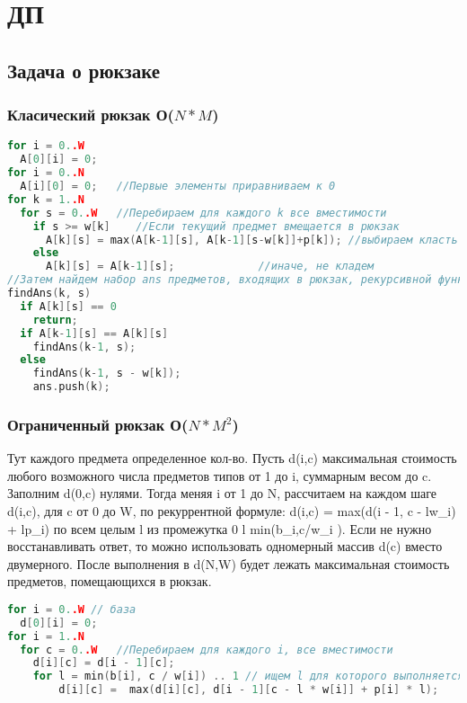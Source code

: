 \chapter{ДП}
\section{Задача о рюкзаке}
\subsection{Класический рюкзак О($N*M$)}
\begin{lstlisting}[language = C++]
for i = 0..W
  A[0][i] = 0;
for i = 0..N
  A[i][0] = 0;   //Первые элементы приравниваем к 0
for k = 1..N               
  for s = 0..W   //Перебираем для каждого k все вместимости 
    if s >= w[k]    //Если текущий предмет вмещается в рюкзак
      A[k][s] = max(A[k-1][s], A[k-1][s-w[k]]+p[k]); //выбираем класть его или нет
    else 
      A[k][s] = A[k-1][s];             //иначе, не кладем
//Затем найдем набор ans предметов, входящих в рюкзак, рекурсивной функцией:
findAns(k, s)
  if A[k][s] == 0 
    return;
  if A[k-1][s] == A[k][s]
    findAns(k-1, s);
  else 
    findAns(k-1, s - w[k]);
    ans.push(k);
\end{lstlisting}
\subsection{Ограниченный рюкзак О($N*M^2$)}
Тут каждого предмета определенное кол-во.\newline
Пусть d(i,c) максимальная стоимость любого возможного числа предметов типов от 1 до i, суммарным весом до c.
Заполним d(0,c) нулями.
Тогда меняя i от 1 до N, рассчитаем на каждом шаге d(i,c), для c от 0 до W, по рекуррентной формуле:
d(i,c) = max(d(i - 1, c - lw_i) + lp_i) по всем целым l из промежутка 0 \le l \le min(b_i,\lfloor c/w_i \rfloor).
Если не нужно восстанавливать ответ, то можно использовать одномерный массив d(c) вместо двумерного.
После выполнения в d(N,W) будет лежать максимальная стоимость предметов, помещающихся в рюкзак.
\begin{lstlisting}[language = C++]
for i = 0..W // база
  d[0][i] = 0;
for i = 1..N             
  for c = 0..W   //Перебираем для каждого i, все вместимости 
    d[i][c] = d[i - 1][c];
    for l = min(b[i], c / w[i]) .. 1 // ищем l для которого выполняется максимум
        d[i][c] =  max(d[i][c], d[i - 1][c - l * w[i]] + p[i] * l);
\end{lstlisting}
